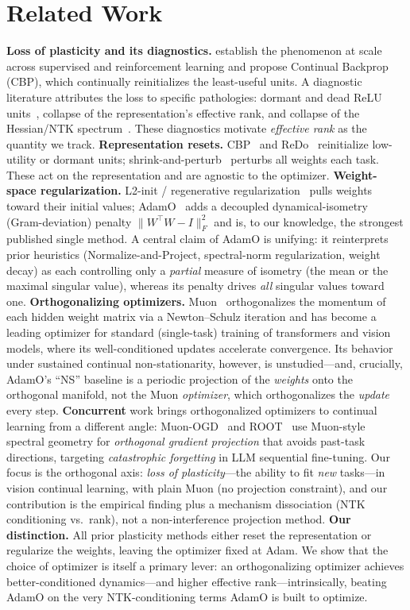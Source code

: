 \documentclass[letterpaper]{article} %
\begin{document}
\section{Related Work}
\textbf{Loss of plasticity and its diagnostics.} \citet{dohare2024} establish the phenomenon at scale across supervised and reinforcement learning and propose Continual Backprop (CBP), which continually reinitializes the least-useful units. A diagnostic literature attributes the loss to specific pathologies: dormant and dead ReLU units~\citep{sokar2023}, collapse of the representation's effective rank, and collapse of the Hessian/NTK spectrum~\citep{spectralcollapse2025}. These diagnostics motivate \emph{effective rank} as the quantity we track. \textbf{Representation resets.} CBP~\citep{dohare2024} and ReDo~\citep{sokar2023} reinitialize low-utility or dormant units; shrink-and-perturb~\citep{ash2020} perturbs all weights each task. These act on the representation and are agnostic to the optimizer. \textbf{Weight-space regularization.} L2-init / regenerative regularization~\citep{kumar2023} pulls weights toward their initial values; AdamO~\citep{adamo2026} adds a decoupled dynamical-isometry (Gram-deviation) penalty $\|W^\top W-I\|_F^2$ and is, to our knowledge, the strongest published single method. A central claim of AdamO is unifying: it reinterprets prior heuristics (Normalize-and-Project, spectral-norm regularization, weight decay) as each controlling only a \emph{partial} measure of isometry (the mean or the maximal singular value), whereas its penalty drives \emph{all} singular values toward one. \textbf{Orthogonalizing optimizers.} Muon~\citep{muon2024} orthogonalizes the momentum of each hidden weight matrix via a Newton--Schulz iteration and has become a leading optimizer for standard (single-task) training of transformers and vision models, where its well-conditioned updates accelerate convergence. Its behavior under sustained continual non-stationarity, however, is unstudied---and, crucially, AdamO's ``NS'' baseline is a periodic projection of the \emph{weights} onto the orthogonal manifold, not the Muon \emph{optimizer}, which orthogonalizes the \emph{update} every step. \textbf{Concurrent} work brings orthogonalized optimizers to continual learning from a different angle: Muon-OGD~\citep{muonogd2026} and ROOT~\citep{root2025} use Muon-style spectral geometry for \emph{orthogonal gradient projection} that avoids past-task directions, targeting \emph{catastrophic forgetting} in LLM sequential fine-tuning. Our focus is the orthogonal axis: \emph{loss of plasticity}---the ability to fit \emph{new} tasks---in vision continual learning, with plain Muon (no projection constraint), and our contribution is the empirical finding plus a mechanism dissociation (NTK conditioning vs.\ rank), not a non-interference projection method. \textbf{Our distinction.} All prior plasticity methods either reset the representation or regularize the weights, leaving the optimizer fixed at Adam. We show that the choice of optimizer is itself a primary lever: an orthogonalizing optimizer achieves better-conditioned dynamics---and higher effective rank---intrinsically, beating AdamO on the very NTK-conditioning terms AdamO is built to optimize.
\end{document}
